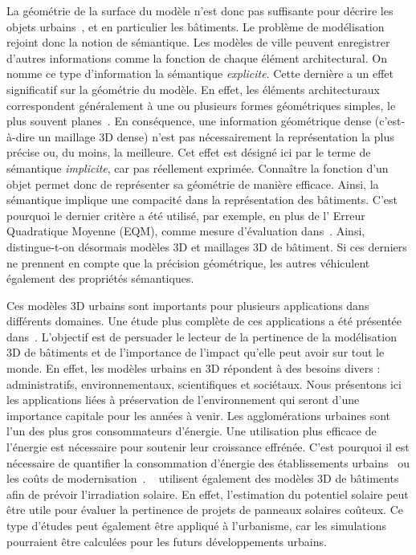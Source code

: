         La géométrie de la surface du modèle n'est donc pas suffisante pour décrire les objets urbains~\parencite{biljecki2016improved}, et en particulier les bâtiments.
        Le problème de modélisation rejoint donc la notion de sémantique.
        Les modèles de ville peuvent enregistrer d'autres informations comme la fonction de chaque élément architectural.
        On nomme ce type d'information la sémantique \textit{explicite}.
        Cette dernière a un effet significatif sur la géométrie du modèle.
        En effet, les éléments architecturaux correspondent généralement à une ou plusieurs formes géométriques simples, le plus souvent planes~\parencite{kolbe2005citygml}.
        En conséquence, une information géométrique dense (c'est-à-dire un maillage 3D dense) n'est pas nécessairement la représentation la plus précise ou, du moins, la meilleure.
        Cet effet est désigné ici par le terme de sémantique \textit{implicite}, car pas réellement exprimée.
        Connaître la fonction d'un objet permet donc de représenter sa géométrie de manière efficace.
        Ainsi, la sémantique implique une compacité dans la représentation des bâtiments.
        C'est pourquoi le dernier critère a été utilisé, par exemple, en plus de l' Erreur Quadratique Moyenne (EQM), comme mesure d'évaluation dans~\parencite{lafarge2012creating}.
        Ainsi, distingue-t-on désormais modèles 3D et maillages 3D de bâtiment.
        Si ces derniers ne prennent en compte que la précision géométrique, les autres véhiculent également des propriétés sémantiques.

        Ces modèles 3D urbains sont importants pour plusieurs applications dans différents domaines.
        Une étude plus complète de ces applications a été présentée dans~\parencite{biljecki2015applications}.
        L'objectif est de persuader le lecteur de la pertinence de la modélisation 3D de bâtiments et de l'importance de l'impact qu'elle peut avoir sur tout le monde.
        En effet, les modèles urbains en 3D répondent à des besoins divers : administratifs, environnementaux, scientifiques et sociétaux.
        Nous présentons ici les applications liées à préservation de l'environnement qui seront d'une importance capitale pour les années à venir.
        Les agglomérations urbaines sont l'un des plus gros consommateurs d'énergie.
        Une utilisation plus efficace de l'énergie est nécessaire pour soutenir leur croissance effrénée.
        C'est pourquoi il est nécessaire de quantifier la consommation d'énergie des établissements urbains~\parencite{wate20153d} ou les coûts de modernisation~\parencite{previtali2014automatic}.
        ~\textcite{biljecki2015propagation} utilisent également des modèles 3D de bâtiments afin de prévoir l'irradiation solaire.
        En effet, l'estimation du potentiel solaire peut être utile pour évaluer la pertinence de projets de panneaux solaires coûteux.
        Ce type d'études peut également être appliqué à l'urbanisme, car les simulations pourraient être calculées pour les futurs développements urbains.\\

